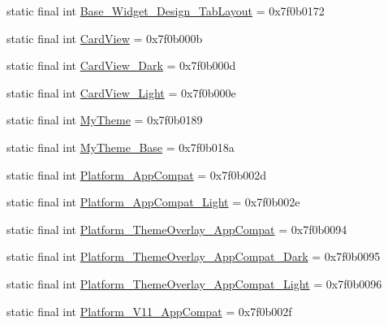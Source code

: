 \begin{CompactItemize}
\item 
static final int \hyperlink{classandroid_1_1support_1_1graphics_1_1drawable_1_1animated_1_1_r_1_1style_74eecbea5ec718bb12b32c47d9114403}{Base\_\-Widget\_\-Design\_\-TabLayout} = 0x7f0b0172
\item 
static final int \hyperlink{classandroid_1_1support_1_1graphics_1_1drawable_1_1animated_1_1_r_1_1style_1afe80eb804da58c9123763f53032ea7}{CardView} = 0x7f0b000b
\item 
static final int \hyperlink{classandroid_1_1support_1_1graphics_1_1drawable_1_1animated_1_1_r_1_1style_4b9a35f439f56a27d82c29f833ea9249}{CardView\_\-Dark} = 0x7f0b000d
\item 
static final int \hyperlink{classandroid_1_1support_1_1graphics_1_1drawable_1_1animated_1_1_r_1_1style_7e2acb66d6c8b0bdffaf028c579fc3fe}{CardView\_\-Light} = 0x7f0b000e
\item 
static final int \hyperlink{classandroid_1_1support_1_1graphics_1_1drawable_1_1animated_1_1_r_1_1style_264ddeb1626adc2713eb7fd5bc146dd2}{MyTheme} = 0x7f0b0189
\item 
static final int \hyperlink{classandroid_1_1support_1_1graphics_1_1drawable_1_1animated_1_1_r_1_1style_7fbe1ed7ea1ff4d822158bdadc3bf007}{MyTheme\_\-Base} = 0x7f0b018a
\item 
static final int \hyperlink{classandroid_1_1support_1_1graphics_1_1drawable_1_1animated_1_1_r_1_1style_f01f25639e7b524689ff81c3f4dc1876}{Platform\_\-AppCompat} = 0x7f0b002d
\item 
static final int \hyperlink{classandroid_1_1support_1_1graphics_1_1drawable_1_1animated_1_1_r_1_1style_a05aba2cee1f2f6f5940b531867e51a7}{Platform\_\-AppCompat\_\-Light} = 0x7f0b002e
\item 
static final int \hyperlink{classandroid_1_1support_1_1graphics_1_1drawable_1_1animated_1_1_r_1_1style_f961f1f911f0f8e2f6321029a22f0151}{Platform\_\-ThemeOverlay\_\-AppCompat} = 0x7f0b0094
\item 
static final int \hyperlink{classandroid_1_1support_1_1graphics_1_1drawable_1_1animated_1_1_r_1_1style_030bad761db53178205a28ad442da2a8}{Platform\_\-ThemeOverlay\_\-AppCompat\_\-Dark} = 0x7f0b0095
\item 
static final int \hyperlink{classandroid_1_1support_1_1graphics_1_1drawable_1_1animated_1_1_r_1_1style_53253784f152d00ecf6a2e07cc4d8f4a}{Platform\_\-ThemeOverlay\_\-AppCompat\_\-Light} = 0x7f0b0096
\item 
static final int \hyperlink{classandroid_1_1support_1_1graphics_1_1drawable_1_1animated_1_1_r_1_1style_61a31d6d7d9828e18b7f7706b94ab602}{Platform\_\-V11\_\-AppCompat} = 0x7f0b002f

\end{CompactItemize}
